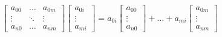 \documentclass[11pt]{article} %
\begin{document}
\begin{enumerate}
    \begin{align*}
        \begin{bmatrix}
            a_{00} & \dots  & a_{0m} \\
            \vdots & \ddots & \vdots \\
            a_{n0} & \dots  & a_{nm}
        \end{bmatrix}
        \begin{bmatrix}
            a_{0i} \\
            \vdots \\
            a_{mi}
        \end{bmatrix}
        =
        a_{0i} \begin{bmatrix}
            a_{00} \\
            \vdots \\
            a_{n0}
        \end{bmatrix}
        + \dots +
        a_{mi} \begin{bmatrix}
            a_{0m} \\
            \vdots \\
            a_{nm}
        \end{bmatrix}
    \end{align*}


\end{enumerate}
\end{document}
